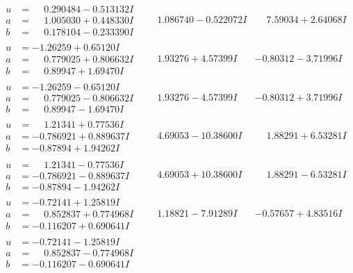 \documentclass[1p]{elsarticle_modified}
\theoremstyle{definition}
\begin{document}
$$\begin{array}{c|c|c}
\begin{aligned}
u &= \phantom{-}0.290484 - 0.513132 I \\
a &= \phantom{-}1.005030 + 0.448330 I \\
b &= \phantom{-}0.178104 - 0.233390 I\end{aligned}
 & \phantom{-}1.086740 - 0.522072 I & \phantom{-}7.59034 + 2.64068 I \\ \hline\begin{aligned}
u &= -1.26259 + 0.65120 I \\
a &= \phantom{-}0.779025 + 0.806632 I \\
b &= \phantom{-}0.89947 + 1.69470 I\end{aligned}
 & \phantom{-}1.93276 + 4.57399 I & -0.80312 - 3.71996 I \\ \hline\begin{aligned}
u &= -1.26259 - 0.65120 I \\
a &= \phantom{-}0.779025 - 0.806632 I \\
b &= \phantom{-}0.89947 - 1.69470 I\end{aligned}
 & \phantom{-}1.93276 - 4.57399 I & -0.80312 + 3.71996 I \\ \hline\begin{aligned}
u &= \phantom{-}1.21341 + 0.77536 I \\
a &= -0.786921 + 0.889637 I \\
b &= -0.87894 + 1.94262 I\end{aligned}
 & \phantom{-}4.69053 - 10.38600 I & \phantom{-}1.88291 + 6.53281 I \\ \hline\begin{aligned}
u &= \phantom{-}1.21341 - 0.77536 I \\
a &= -0.786921 - 0.889637 I \\
b &= -0.87894 - 1.94262 I\end{aligned}
 & \phantom{-}4.69053 + 10.38600 I & \phantom{-}1.88291 - 6.53281 I \\ \hline\begin{aligned}
u &= -0.72141 + 1.25819 I \\
a &= \phantom{-}0.852837 + 0.774968 I \\
b &= -0.116207 + 0.690641 I\end{aligned}
 & \phantom{-}1.18821 - 7.91289 I & -0.57657 + 4.83516 I \\ \hline\begin{aligned}
u &= -0.72141 - 1.25819 I \\
a &= \phantom{-}0.852837 - 0.774968 I \\
b &= -0.116207 - 0.690641 I\end{aligned}

\end{array}$$
\end{document}

